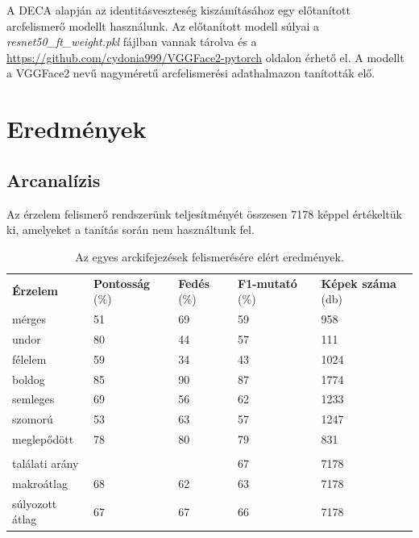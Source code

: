 \documentclass[12pt,a4]{article}
\begin{document}
    A DECA alapján az identitásveszteség kiszámításához egy előtanított arcfelismerő modellt használunk. Az előtanított modell súlyai a \textit{resnet50\_ft\_weight.pkl} fájlban vannak tárolva és a \url{https://github.com/cydonia999/VGGFace2-pytorch} oldalon érhető el.
    A modellt a VGGFace2 nevű nagyméretű arcfelismerési adathalmazon tanították elő.
    
    \section{Eredmények}
 	      \subsection{Arcanalízis}

            Az érzelem felismerő rendszerünk teljesítményét összesen 7178 képpel értékeltük ki, amelyeket a tanítás során nem használtunk fel.

            \begin{table}[htb] 
                \begin{tabular}{lllll}
                \textbf{Érzelem}     & \textbf{Pontosság} (\%) & \textbf{Fedés} (\%) & \textbf{F1-mutató} (\%) & \textbf{Képek száma} (db) \\
                mérges      & 51             & 69               & 59             & 958              \\
                undor       & 80             & 44               & 57             & 111              \\
                félelem     & 59             & 34               & 43             & 1024             \\
                boldog      & 85             & 90               & 87             & 1774             \\
                semleges    & 69             & 56               & 62             & 1233             \\
                szomorú     & 53             & 63               & 57             & 1247             \\
                meglepődött & 78             & 80               & 79             & 831             \\
                \\
                találati arány  &    &   & 67    & 7178 \\
                makroátlag  &68    &62   & 63    & 7178 \\
                súlyozott átlag  &67    &67   & 66    & 7178 \\
                \end{tabular}
                \caption{Az egyes arckifejezések felismerésére elért eredmények.}
                \label{fig:fec-result-table}
            \end{table}
\end{document}
